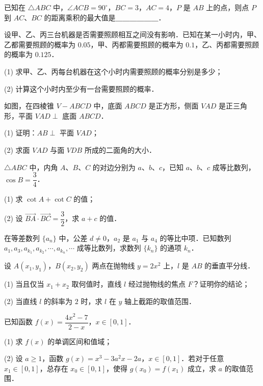 \begin{question}
已知在 $\triangle ABC$ 中，$\angle ACB = 90^\circ$，$BC = 3$，$AC = 4$，$P$ 是 $AB$ 上的点，则点 $P$ 到 $AC$、$BC$ 的距离乘积的最大值是＿＿＿＿＿＿．

\end{question}
\begin{question}
设甲、乙、丙三台机器是否需要照顾相互之间没有影响．已知在某一小时内，甲、乙都需要照顾的概率为 $0.05$，甲、丙都需要照顾的概率为 $0.1$，乙、丙都需要照顾的概率为 $0.125$．

(1) 求甲、乙、丙每台机器在这个小时内需要照顾的概率分别是多少；

(2) 计算这个小时内至少有一台需要照顾的概率．

\Needspace{0.4\textheight}
\end{question}
\begin{question}
如图，在四棱锥 $V - ABCD$ 中，底面 $ABCD$ 是正方形，侧面 $VAD$ 是正三角形，平面 $VAD \perp$ 底面 $ABCD$．

(1) 证明：$AB \perp$ 平面 $VAD$；

(2) 求面 $VAD$ 与面 $VDB$ 所成的二面角的大小．
\nopagebreak[4]
\begin{center}\end{center}
\nopagebreak[4]
\end{question}
\begin{question}
$\triangle ABC$ 中，内角 $A$、$B$、$C$ 的对边分别为 $a$、$b$、$c$，已知 $a$、$b$、$c$ 成等比数列，$\cos B = \dfrac{3}{4}$．

(1) 求 $\cot A + \cot C$ 的值；

(2) 设 $\overrightarrow{BA} \cdot \overrightarrow{BC} = \dfrac{3}{2}$，求 $a + c$ 的值．

\end{question}
\begin{question}
在等差数列 $\{a_n\}$ 中，公差 $d \neq 0$，$a_2$ 是 $a_1$ 与 $a_4$ 的等比中项．已知数列 $a_1, a_3, a_{k_1}, a_{k_2}, \cdots, a_{k_n}, \cdots$ 成等比数列，求数列 $\{k_n\}$ 的通项 $k_n$．

\end{question}
\begin{question}
设 $A(x_1, y_1)$，$B(x_2, y_2)$ 两点在抛物线 $y = 2x^2$ 上，$l$ 是 $AB$ 的垂直平分线．

(1) 当且仅当 $x_1 + x_2$ 取何值时，直线 $l$ 经过抛物线的焦点 $F$？证明你的结论；

(2) 当直线 $l$ 的斜率为 $2$ 时，求 $l$ 在 $y$ 轴上截距的取值范围．

\end{question}
\begin{question}
已知函数 $f(x) = \dfrac{4x^2 - 7}{2 - x}$，$x \in [0, 1]$．

(1) 求 $f(x)$ 的单调区间和值域；

(2) 设 $a \geqslant 1$，函数 $g(x) = x^3 - 3a^2x - 2a$，$x \in [0, 1]$．若对于任意 $x_1 \in [0, 1]$，总存在 $x_0 \in [0, 1]$，使得 $g(x_0) = f(x_1)$ 成立，求 $a$ 的取值范围．

\end{question}